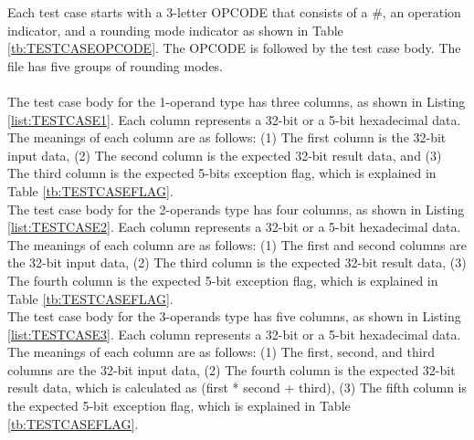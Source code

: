 \begin{description}
Each test case starts with a 3-letter OPCODE that consists of a \#, an operation indicator, and a rounding mode indicator as shown in Table \ref{tb:TESTCASEOPCODE}. The OPCODE is followed by the test case body. The file has five groups of rounding modes.\\\\

The test case body for the 1-operand type has three columns, as shown in Listing \ref{list:TESTCASE1}. Each column represents a 32-bit or a 5-bit hexadecimal data. The meanings of each column are as follows: (1) The first column is the 32-bit input data, (2) The second column is the expected 32-bit result data, and (3) The third column is the expected 5-bits exception flag, which is explained in Table \ref{tb:TESTCASEFLAG}.\\

The test case body for the 2-operands type has four columns, as shown in Listing \ref{list:TESTCASE2}. Each column represents a 32-bit or a 5-bit hexadecimal data. The meanings of each column are as follows: (1) The first and second columns are the 32-bit input data, (2) The third column is the expected 32-bit result data, (3) The fourth column is the expected 5-bit exception flag, which is explained in Table \ref{tb:TESTCASEFLAG}.\\

The test case body for the 3-operands type has five columns, as shown in Listing \ref{list:TESTCASE3}. Each column represents a 32-bit or a 5-bit hexadecimal data. The meanings of each column are as follows: (1) The first, second, and third columns are the 32-bit input data, (2) The fourth column is the expected 32-bit result data, which is calculated as (first * second + third), (3) The fifth column is the expected 5-bit exception flag, which is explained in Table \ref{tb:TESTCASEFLAG}.


\end{description}
